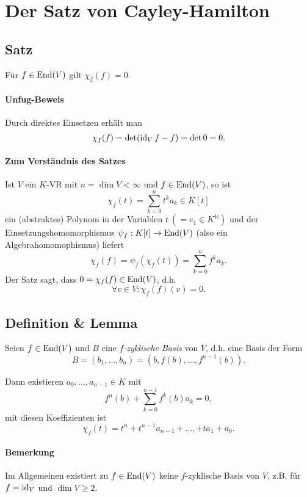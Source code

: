 \section{Der Satz von Cayley-Hamilton}
\subsection{Satz}
	Für $ f\in\operatorname{End}(V) $ gilt $ \chi_f(f) = 0$.
\paragraph{Unfug-Beweis}
	Durch direktes Einsetzen erhält man
		\[ \chi_f(f)=\det (\operatorname{id}_V f-f) = \det 0 = 0. \]
\paragraph{Zum Verständnis des Satzes}
	Ist $ V $ ein $ K $-VR mit $ n=\dim V < \infty $ und $ f\in \operatorname{End} (V) $, so ist
		\[ \chi_f(t) = \sum_{k=0}^{n}t^ka_k \in K[t] \]
	ein (abstraktes) Polynom in der Variablen $ t\ (= e_1\in K^\mathbb{N})$ und der Einsetzungshomomorphismus $ \psi_f:K[t]\to \operatorname{End}(V) $ (also ein Algebrahomomophismus) liefert
		\[ \chi_f(f) = \psi_f\left(\chi_f(t)\right) = \sum_{k=0}^{n}f^k a_k. \]
	Der Satz sagt, dass $ 0 = \chi_f(f)\in \operatorname{End}(V) $, d.h.
		\[ \forall v\in V: \chi_f(f)(v) = 0. \]
		
\subsection{Definition \& Lemma}
\begin{Definition}\label{fzykl}
	Seien $ f\in\operatorname{End}(V) $ und $ B $ eine \emph{$ f $-zyklische Basis} von $ V $, d.h. eine Basis der Form
		\[ B= (b_1,\dots,b_n) = \left(b,f(b),\dots,f^{n-1}(b)\right). \]		
\end{Definition}
\begin{Lemma}
	Dann existieren $ a_0,\dots,a_{n-1}\in K $ mit
		\[ f^n(b)+\sum_{k=0}^{n-1}f^k(b)a_k = 0, \]
	mit diesen Koeffizienten ist
		\[ \chi_f(t) = t^n+t^{n-1}a_{n-1}+\dots,+ta_1+a_0. \]
\end{Lemma}
\paragraph{Bemerkung}
	Im Allgemeinen existiert zu $ f\in \operatorname{End}(V) $ keine $ f $-zyklische Basis von $ V $, z.B. für $ f = \operatorname{id}_V $ und $ \dim V \geq 2 $.
